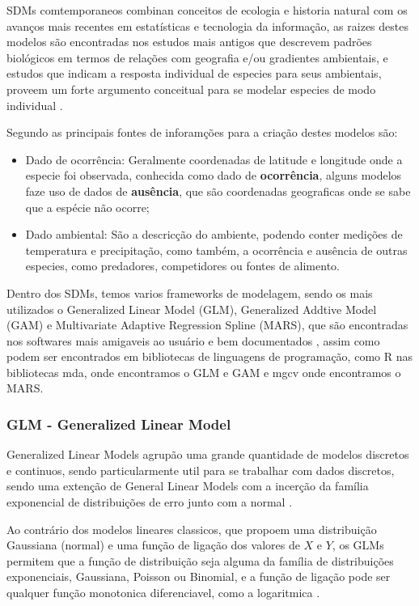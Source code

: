 \documentclass[
	12pt,				%
	openright,			%
	oneside,			%
	a4paper,			%
	english,			%
	brazil				%
	]{abntex2}
\begin{document}
SDMs comtemporaneos combinan conceitos de ecologia e historia natural com os avanços mais recentes em estatísticas e
tecnologia da informação, as raizes destes modelos são encontradas nos estudos mais antigos que descrevem padrões
biológicos em termos de relações com geografia e/ou gradientes ambientais, e estudos que indicam a resposta individual
de especies para seus ambientais, proveem um forte argumento conceitual para se modelar especies de modo individual 
\cite{speciesDistributionModels}.

Segundo \cite{tiposDados_sdm} as principais fontes de inforamções para a criação destes modelos são: 
\begin{itemize}
	\item Dado de ocorrência: Geralmente coordenadas de latitude e longitude onde a especie foi observada, conhecida como
	dado de \textbf{ocorrência}, alguns modelos faze uso de dados de \textbf{ausência}, que são coordenadas geograficas 
	onde se sabe que a espécie não ocorre;
	\item Dado ambiental: São a descricção do ambiente, podendo conter medições de temperatura e precipitação, como
	também, a ocorrência e ausência de outras especies, como predadores, competidores ou fontes de alimento.
\end{itemize}

Dentro dos SDMs, temos varios frameworks de modelagem, sendo os mais utilizados o Generalized Linear Model (GLM), 
Generalized Addtive Model (GAM) e Multivariate Adaptive Regression Spline (MARS), que são encontradas nos
softwares mais amigaveis ao usuário e bem documentados \cite{predPerform33models}, assim como podem ser encontrados em 
bibliotecas de linguagens de programação, como R nas bibliotecas mda, onde encontramos o GLM e GAM \cite{mda} e mgcv 
onde encontramos o MARS\cite{mgcv}.

\subsubsection{GLM - Generalized Linear Model}

Generalized Linear Models agrupão uma grande quantidade de modelos discretos e continuos, sendo particularmente util para se 
trabalhar com dados discretos, sendo uma extenção de General Linear Models com a incerção da família exponencial de 
distribuições de erro junto com a normal \cite{GLM}.

Ao contrário dos modelos lineares classicos, que propoem uma distribuição Gaussiana (normal) e uma função de ligação dos
valores de $X$ e $Y$, os GLMs permitem que a função de distribuição seja alguma da família de distribuições 
exponenciais, Gaussiana, Poisson ou Binomial, e a função de ligação pode ser qualquer função monotonica 
diferenciavel, como a logaritmica \cite{GAMeGLM_especie_estudo}.
\end{document}
